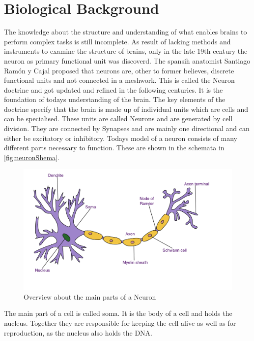 \section{Biological Background}
The knowledge about the structure and understanding of what enables brains to perform complex tasks is still incomplete. As result of lacking methods and instruments to examine the structure of brains, only in the late 19th century the neuron as primary functional unit was discoverd. The spansih anatomist Santiago Ramón y Cajal proposed that neurons are, other to former believes, discrete functional units and not connected in a meshwork. This is called the Neuron doctrine and got updated and refined  in the following centuries\cite{10.2307/1757040}. It is the foundation of todays understanding of the brain. The key elements of the doctrine specify that the brain is made up of individual units which are cells and can be specialised. These units are called Neurons and are generated by cell division. They are connected by Synapses and are mainly one directional and can either be excitatory or inhibitory\cite{lopez2006neuron}.
\newline
Todays model of a neuron consists of many different parts necessary to function. These are shown in the schemata in \autoref{fig:neuronShema}.
\begin{figure}[htpb]
  \centering
  \includegraphics[width = \textwidth]{figures/Neuron.png}
  \caption{Overview about the main parts of a Neuron \cite{wikiNeuron}}
  \label{fig:neuronShema}
\end{figure}
The main part of a cell is called soma. It is the  body of a cell and holds the nucleus. Together they are responsible for keeping the cell alive as well as for reproduction, as the nucleus also holds the DNA.
